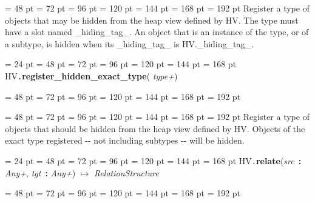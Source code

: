 {{{{{\par}
\par}
{\par \noindent  \leftskip = 48 pt  \leftmargini = 72 pt  \leftmarginii = 96 pt  \leftmarginiii = 120 pt  \leftmarginiv = 144 pt  \leftmarginv = 168 pt  \leftmarginvi = 192 pt 
Register a type of objects that may be hidden from the heap view
defined by HV. The type must have a slot named {\_}hiding{\_}tag{\_}. An object
that is an instance of the type, or of a subtype, is hidden when its
{\_}hiding{\_}tag{\_} is HV.{\_}hiding{\_}tag{\_}.
\par}
\par}
\par}
{\par \noindent  \leftskip = 24 pt  \leftmargini = 48 pt  \leftmarginii = 72 pt  \leftmarginiii = 96 pt  \leftmarginiv = 120 pt  \leftmarginv = 144 pt  \leftmarginvi = 168 pt HV{\tt .\/}{\bf {\large {\bf register{\_}hidden{\_}exact{\_}type\/}}\/}( {\em type+\/}){\par \noindent
{\par \noindent  \leftskip = 48 pt  \leftmargini = 72 pt  \leftmarginii = 96 pt  \leftmarginiii = 120 pt  \leftmarginiv = 144 pt  \leftmarginv = 168 pt  \leftmarginvi = 192 pt {\par \noindent
\par}
\par}
{\par \noindent  \leftskip = 48 pt  \leftmargini = 72 pt  \leftmarginii = 96 pt  \leftmarginiii = 120 pt  \leftmarginiv = 144 pt  \leftmarginv = 168 pt  \leftmarginvi = 192 pt 
Register a type of objects that should be hidden from the heap view
defined by HV. Objects of the exact type registered -{}- not including
subtypes -{}- will be hidden.
\par}
\par}
\par}
{\par \noindent  \leftskip = 24 pt  \leftmargini = 48 pt  \leftmarginii = 72 pt  \leftmarginiii = 96 pt  \leftmarginiv = 120 pt  \leftmarginv = 144 pt  \leftmarginvi = 168 pt HV{\tt .\/}{\bf {\large {\bf relate\/}}\/}({\em src\/}~{\bf :}  {\em Any+\/}, {\em tgt\/}~{\bf :}  {\em Any+\/}) \(\mapsto \)  {\em RelationStructure\/}{\par \noindent
{\par \noindent  \leftskip = 48 pt  \leftmargini = 72 pt  \leftmarginii = 96 pt  \leftmarginiii = 120 pt  \leftmarginiv = 144 pt  \leftmarginv = 168 pt  \leftmarginvi = 192 pt {\par \noindent
}}}}}

